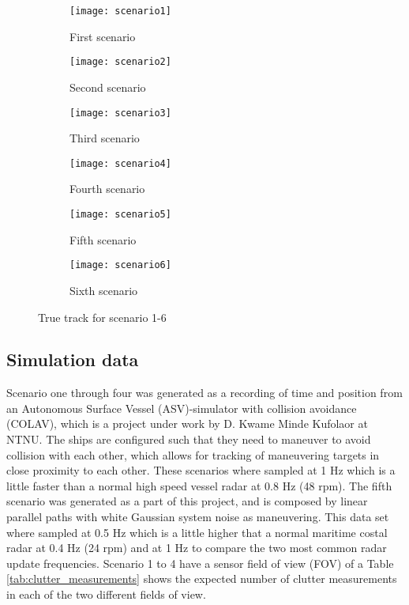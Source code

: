\begin{figure}
    \centering
    \begin{subfigure}{0.49\textwidth}
        \centering
        \texttt{[image: scenario1]}
        \caption{First scenario}
    \end{subfigure}
    \begin{subfigure}{0.49\textwidth}
        \centering
        \texttt{[image: scenario2]}
        \caption{Second scenario}
    \end{subfigure}
    \begin{subfigure}{0.49\textwidth}
        \centering
        \texttt{[image: scenario3]}
        \caption{Third scenario}
    \end{subfigure}
    \begin{subfigure}{0.49\textwidth}
        \centering
        \texttt{[image: scenario4]}
        \caption{Fourth scenario}
    \end{subfigure}
    \begin{subfigure}{0.49\textwidth}
        \centering
        \texttt{[image: scenario5]}
        \caption{Fifth scenario}
    \end{subfigure}
    \begin{subfigure}{0.49\textwidth}
        \centering
        \texttt{[image: scenario6]}
        \caption{Sixth scenario}
    \end{subfigure}
    \caption{True track for scenario 1-6}
    \label{fig:true_tracks}
\end{figure} 

\subsection{Simulation data}
Scenario one through four was generated as a recording of time and position from an Autonomous Surface Vessel (ASV)-simulator with collision avoidance (COLAV), which is a project under work by D. Kwame Minde Kufolaor at NTNU. The ships are configured such that they need to maneuver to avoid collision with each other, which allows for tracking of maneuvering targets in close proximity to each other. These scenarios where sampled at 1 Hz which is a little faster than a normal high speed vessel radar at 0.8 Hz (48 rpm). The fifth scenario was generated as a part of this project, and is composed by linear parallel paths with white Gaussian system noise as maneuvering. This data set where sampled at 0.5 Hz which is a little higher that a normal maritime costal radar at 0.4 Hz (24 rpm) and at 1 Hz to compare the two most common radar update frequencies. Scenario 1 to 4 have a sensor field of view (FOV) of a Table \ref{tab:clutter_measurements} shows the expected number of clutter measurements in each of the two different fields of view. 

